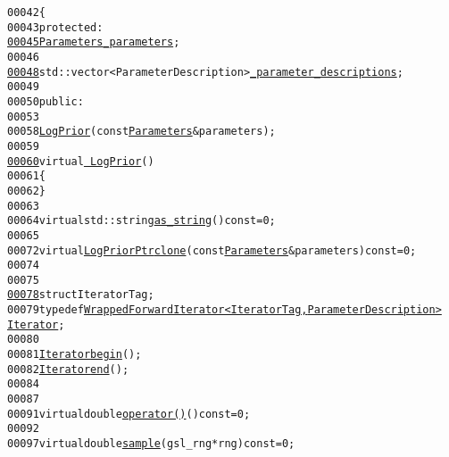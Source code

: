 \begin{footnotesize}
\begin{alltt}
00042     \{
00043         \textcolor{keyword}{protected}:
\hypertarget{log__prior_8hh_source_l00045}{}\hyperlink{classeos_1_1LogPrior_a5b24d36e7d7d2f77d5a7d6533233f93b}{00045}             \hyperlink{classeos_1_1Parameters}{Parameters} \hyperlink{classeos_1_1LogPrior_a5b24d36e7d7d2f77d5a7d6533233f93b}{_parameters};
00046 
\hypertarget{log__prior_8hh_source_l00048}{}\hyperlink{classeos_1_1LogPrior_a2b9c6a50c9f4399e44973bad25b390be}{00048}             std::vector<ParameterDescription> \hyperlink{classeos_1_1LogPrior_a2b9c6a50c9f4399e44973bad25b390be}{_parameter_descriptions};
00049 
00050         \textcolor{keyword}{public}:
00053 
00058             \hyperlink{classeos_1_1LogPrior_ae06bbf3b7073084d135bedd818fbf988}{LogPrior}(\textcolor{keyword}{const} \hyperlink{classeos_1_1Parameters}{Parameters} & parameters);
00059 
\hypertarget{log__prior_8hh_source_l00060}{}\hyperlink{classeos_1_1LogPrior_affbfcbe3bf1a16aa5e696880d20e2822}{00060}             \textcolor{keyword}{virtual} \hyperlink{classeos_1_1LogPrior_affbfcbe3bf1a16aa5e696880d20e2822}{~LogPrior}()
00061             \{
00062             \}
00063 
00064             \textcolor{keyword}{virtual} std::string \hyperlink{classeos_1_1LogPrior_a3c6fe4377cbfdf51bf1472ef16272660}{as_string}() \textcolor{keyword}{const} = 0;
00065 
00072             \textcolor{keyword}{virtual} \hyperlink{namespaceeos_ac5481e3b46ee55ff24606ee7f6e78651}{LogPriorPtr} \hyperlink{classeos_1_1LogPrior_abb48bbbc8034fc487403fee22265f2c8}{clone}(\textcolor{keyword}{const} \hyperlink{classeos_1_1Parameters}{Parameters} & parameters) \textcolor{keyword}{const} = 0;
00074 
00075 
\hypertarget{log__prior_8hh_source_l00078}{}\hyperlink{classeos_1_1LogPrior_a384dd9ec4424f2269e052e41ca834a3d}{00078}             \textcolor{keyword}{struct }IteratorTag;
00079             \textcolor{keyword}{typedef} \hyperlink{classeos_1_1WrappedForwardIterator}{WrappedForwardIterator<IteratorTag, ParameterDescription>} 
      \hyperlink{classeos_1_1WrappedForwardIterator}{Iterator};
00080 
00081             \hyperlink{classeos_1_1WrappedForwardIterator}{Iterator} \hyperlink{classeos_1_1LogPrior_a50155394c200be97f25ef0e56973dbd8}{begin}();
00082             \hyperlink{classeos_1_1WrappedForwardIterator}{Iterator} \hyperlink{classeos_1_1LogPrior_a093e33ea2441515348249835a99781ba}{end}();
00084 
00087 
00091             \textcolor{keyword}{virtual} \textcolor{keywordtype}{double} \hyperlink{classeos_1_1LogPrior_ac686393e071443d706a104093957e667}{operator() }() \textcolor{keyword}{const} = 0;
00092 
00097             \textcolor{keyword}{virtual} \textcolor{keywordtype}{double} \hyperlink{classeos_1_1LogPrior_a9bbc9805dcb6abbe6d16efff44b43ea3}{sample}(gsl\_rng * rng) \textcolor{keyword}{const} = 0;

\end{alltt}
\end{footnotesize}
